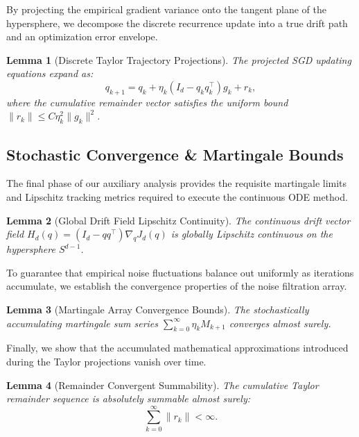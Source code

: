 \documentclass[11pt,a4paper]{article}
\newtheorem{lemma}{Lemma}
\theoremstyle{definition}
\begin{document}
\noindent By projecting the empirical gradient variance onto the tangent plane of the hypersphere, we decompose the discrete recurrence update into a true drift path and an optimization error envelope.

\begin{lemma}[Discrete Taylor Trajectory Projections] \label{lem:lem6}
The projected SGD updating equations expand as:
\begin{equation}
    q_{k+1} = q_k + \eta_k(I_d - q_k q_k^{\top})g_k + r_k,
\end{equation}
where the cumulative remainder vector satisfies the uniform bound $\|r_k\| \le C \eta_k^{2} \|g_k\|^{2}$.
\end{lemma}


\subsection{Stochastic Convergence \& Martingale Bounds}
The final phase of our auxiliary analysis provides the requisite martingale limits and Lipschitz tracking metrics required to execute the continuous ODE method.

\begin{lemma}[Global Drift Field Lipschitz Continuity] \label{lem:lem7}
The continuous drift vector field $H_{d}(q) = (I_d - q q^\top)\nabla_q J_d(q)$ is globally Lipschitz continuous on the hypersphere $S^{d-1}$.
\end{lemma}

\noindent To guarantee that empirical noise fluctuations balance out uniformly as iterations accumulate, we establish the convergence properties of the noise filtration array.

\begin{lemma}[Martingale Array Convergence Bounds] \label{lem:lem8}
The stochastically accumulating martingale sum series $\sum_{k=0}^{\infty} \eta_k  M_{k+1}$ converges almost surely.
\end{lemma}

\noindent Finally, we show that the accumulated mathematical approximations introduced during the Taylor projections vanish over time.

\begin{lemma}[Remainder Convergent Summability] \label{lem:lem9}
The cumulative Taylor remainder sequence is absolutely summable almost surely: 
\begin{equation}
    \sum_{k=0}^{\infty} \|r_k\| < \infty.
\end{equation}
\end{lemma}
\end{document}
